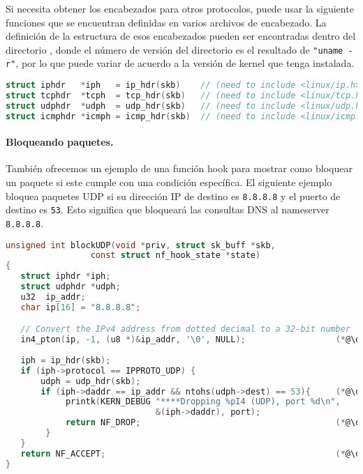 Si necesita obtener los encabezados para otros protocolos, puede usar la siguiente funciones que se encuentran definidas en varios archivos de encabezado. La definición de la estructura de esos encabezados pueden ser encontradas dentro del directorio , donde el número de versión del directorio es el resultado de \texttt{"uname -r"}, por lo que puede variar de acuerdo a la versión de kernel que tenga instalada.

\begin{lstlisting}[language=C]
struct iphdr   *iph   = ip_hdr(skb)    // (need to include <linux/ip.h>) 
struct tcphdr  *tcph  = tcp_hdr(skb)   // (need to include <linux/tcp.h>) 
struct udphdr  *udph  = udp_hdr(skb)   // (need to include <linux/udp.h>) 
struct icmphdr *icmph = icmp_hdr(skb)  // (need to include <linux/icmp.h>) 
\end{lstlisting}
 

\paragraph{Bloqueando paquetes.} 
También ofrecemos un ejemplo de una función hook para mostrar como bloquear un paquete si este cumple con una condición específica. El siguiente ejemplo bloquea paquetes UDP si su dirección IP de destino es \texttt{8.8.8.8} y el puerto de destino es \texttt{53}. Esto significa que bloqueará las consultas DNS al nameserver \texttt{8.8.8.8}. 

\begin{lstlisting}[language=C, caption={Code example: blocking UDP}]
unsigned int blockUDP(void *priv, struct sk_buff *skb,
                 const struct nf_hook_state *state)
{
   struct iphdr *iph;
   struct udphdr *udph;
   u32  ip_addr;
   char ip[16] = "8.8.8.8";

   // Convert the IPv4 address from dotted decimal to a 32-bit number
   in4_pton(ip, -1, (u8 *)&ip_addr, '\0', NULL);                  (*@\ding{202}@*)
   
   iph = ip_hdr(skb);
   if (iph->protocol == IPPROTO_UDP) {
       udph = udp_hdr(skb);                                         
       if (iph->daddr == ip_addr && ntohs(udph->dest) == 53){     (*@\ding{203}@*)
            printk(KERN_DEBUG "****Dropping %pI4 (UDP), port %d\n", 
                              &(iph->daddr), port);                 
            return NF_DROP;                                       (*@\ding{204}@*)
        }
   }
   return NF_ACCEPT;                                              (*@\ding{205}@*)
}
\end{lstlisting}

